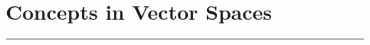 \documentclass[
11pt, %
a4paper, %
oneside, %
headinclude,footinclude, %
BCOR5mm, %
]{scrartcl}
\begin{document}

\newpage %


\section{Concepts in Vector Spaces}
\hrule
\vspace{0.5cm}
\end{document}

